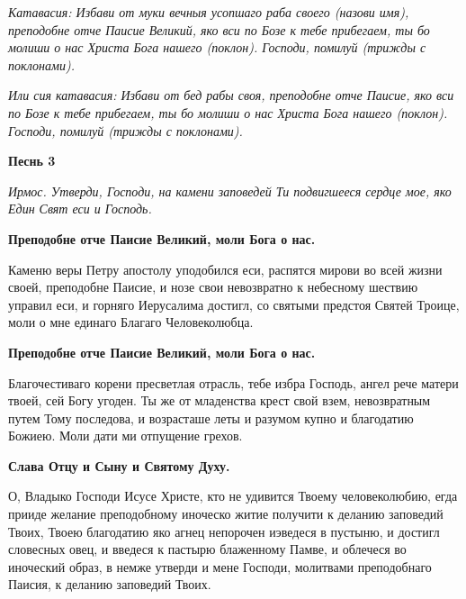 \itshape Катавасия:\normalfont{} Избави от муки вечныя усопшаго раба своего \itshape (назови имя)\normalfont{}, преподобне отче Паисие Великий, яко вси по Бозе к тебе прибегаем, ты бо молиши о нас Христа Бога нашего (\itshape поклон\normalfont{}). Господи, помилуй (\itshape трижды с поклонами\normalfont{}).




\itshape Или сия катавасия:\normalfont{} Избави от бед рабы своя, преподобне отче Паисие, яко вси по Бозе к тебе прибегаем, ты бо молиши о нас Христа Бога нашего (\itshape поклон\normalfont{}). Господи, помилуй (\itshape трижды с поклонами\normalfont{}). 




\bfseries Песнь 3\normalfont{} 




\itshape Ирмос\normalfont{}. Утверди, Господи, на камени заповедей Ти подвигшееся сердце мое, яко Един Свят еси и Господь.




\bfseries Преподобне отче Паисие Великий, моли Бога о нас.\normalfont{} 




Каменю веры Петру апостолу уподобился еси, распятся мирови во всей жизни своей, преподобне Паисие, и нозе свои невозвратно к небесному шествию управил еси, и горняго Иерусалима достигл, со святыми предстоя Святей Троице, моли о мне единаго Благаго Человеколюбца. 




\bfseries Преподобне отче Паисие Великий, моли Бога о нас. \normalfont{}


 Благочестиваго корени пресветлая отрасль, тебе избра Господь, ангел рече матери твоей, сей Богу угоден. Ты же от младенства крест свой взем, невозвратным путем Тому последова, и возрасташе леты и разумом купно и благодатию Божиею. Моли дати ми отпущение грехов. 




\bfseries Слава Отцу и Сыну и Святому Духу.\normalfont{} 




О, Владыко Господи Исусе Христе, кто не удивится Твоему человеколюбию, егда прииде желание преподобному иноческо житие получити к деланию
заповедий Твоих, Твоею благодатию яко агнец непорочен иэведеся в пустыню, и достигл словесных овец, и введеся к пастырю блаженному
Памве, и облечеся во иноческий образ, в немже утверди и мене Господи, молитвами преподобнаго Паисия, к деланию заповедий Твоих. 




